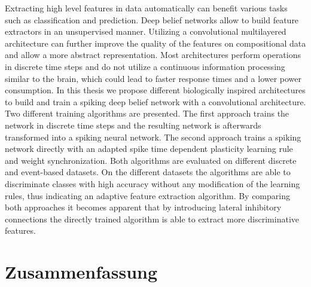 
\abstract

Extracting high level features in data automatically can benefit various tasks such as classification and prediction. 
Deep belief networks allow to build feature extractors in an unsupervised manner. 
Utilizing a convolutional multilayered architecture can further improve the quality of the features on compositional data and allow a more abstract representation. 
Most architectures perform operations in discrete time steps and do not utilize a continuous information processing similar to the brain, which could lead to faster response times and a lower power consumption. 
In this thesis we propose different biologically inspired architectures to build and train a spiking deep belief network with a convolutional architecture. 
Two different training algorithms are presented.
The first approach trains the network in discrete time steps and the resulting network is afterwards transformed into a spiking neural network.
The second approach trains a spiking network directly with an adapted spike time dependent plasticity learning rule and weight synchronization.
Both algorithms are evaluated on different discrete and event-based datasets.
On the different datasets the algorithms are able to discriminate classes with high accuracy without any modification of the learning rules, thus indicating an adaptive feature extraction algorithm.
By comparing both approaches it becomes apparent that by introducing lateral inhibitory connections the directly trained algorithm is able to extract more discriminative features.
 
\chapter*{Zusammenfassung}

